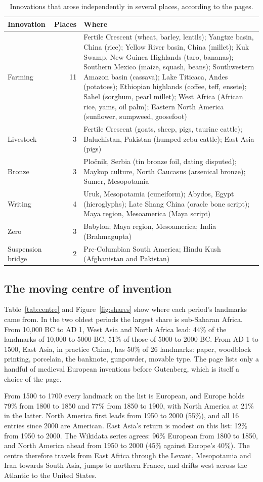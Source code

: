 \documentclass[11pt,a4paper]{article}
\begin{document}
\begin{table}[tbp]\centering\small\caption{Innovations that arose independently in several places, according to the pages.}\label{tab:indep}\begin{tabular}{p{2.6cm}rp{10.6cm}}\toprule Innovation & Places & Where\\\midrule
Farming & 11 & Fertile Crescent (wheat, barley, lentils); Yangtze basin, China (rice); Yellow River basin, China (millet); Kuk Swamp, New Guinea Highlands (taro, bananas); Southern Mexico (maize, squash, beans); Southwestern Amazon basin (cassava); Lake Titicaca, Andes (potatoes); Ethiopian highlands (coffee, teff, ensete); Sahel (sorghum, pearl millet); West Africa (African rice, yams, oil palm); Eastern North America (sunflower, sumpweed, goosefoot)\\
Livestock & 3 & Fertile Crescent (goats, sheep, pigs, taurine cattle); Baluchistan, Pakistan (humped zebu cattle); East Asia (pigs)\\
Bronze & 3 & Pločnik, Serbia (tin bronze foil, dating disputed); Maykop culture, North Caucasus (arsenical bronze); Sumer, Mesopotamia\\
Writing & 4 & Uruk, Mesopotamia (cuneiform); Abydos, Egypt (hieroglyphs); Late Shang China (oracle bone script); Maya region, Mesoamerica (Maya script)\\
Zero & 3 & Babylon; Maya region, Mesoamerica; India (Brahmagupta)\\
Suspension bridge & 2 & Pre-Columbian South America; Hindu Kush (Afghanistan and Pakistan)\\
\bottomrule\end{tabular}\end{table}

\subsection{The moving centre of invention}
Table~\ref{tab:centre} and Figure~\ref{fig:shares} show where each period's landmarks came from. In the two oldest periods the largest share is sub-Saharan Africa. From 10,000 BC to AD 1, West Asia and North Africa lead: 44\% of the landmarks of 10,000 to 5000 BC, 51\% of those of 5000 to 2000 BC. From AD 1 to 1500, East Asia, in practice China, has 50\% of 26 landmarks: paper, woodblock printing, porcelain, the banknote, gunpowder, movable type. The page lists only a handful of medieval European inventions before Gutenberg, which is itself a choice of the page.

From 1500 to 1700 every landmark on the list is European, and Europe holds 79\% from 1800 to 1850 and 77\% from 1850 to 1900, with North America at 21\% in the latter. North America first leads from 1950 to 2000 (55\%), and all 16 entries since 2000 are American. East Asia's return is modest on this list: 12\% from 1950 to 2000. The Wikidata series agrees: 96\% European from 1800 to 1850, and North America ahead from 1950 to 2000 (45\% against Europe's 40\%). The centre therefore travels from East Africa through the Levant, Mesopotamia and Iran towards South Asia, jumps to northern France, and drifts west across the Atlantic to the United States.
\end{document}
